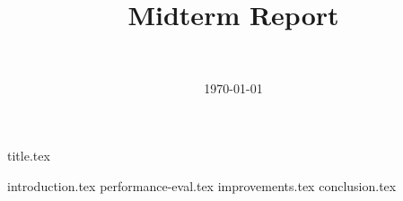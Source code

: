 \documentclass[final]{article}
\title{Midterm Report}
\author{~}
\date{\today}
\begin{document}

{title.tex}
\newpage

{introduction.tex}
{performance-eval.tex}
{improvements.tex}
{conclusion.tex}
\newpage
{}

\printbibliography
\end{document}
